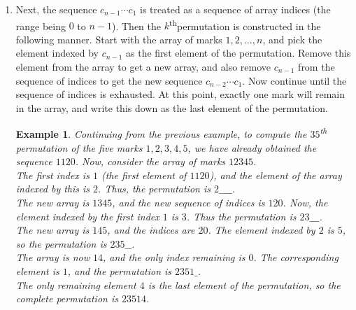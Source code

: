\documentclass[svgnames]{article}
\renewcommand{\th}{\textsuperscript{th}}
\newtheorem{Example}{Example}
\begin{document}
\begin{enumerate}
\item Next, the sequence $c_{n-1} \cdots c_1$ is treated as a sequence of array indices (the range being $0$ to $n - 1$). Then the $k$\th permutation is constructed in the following manner. Start with the array of marks $1, 2, \ldots, n$, and pick the element indexed by $c_{n-1}$ as the first element of the permutation. Remove this element from the array to get a new array, and also remove $c_{n-1}$ from the sequence of indices to get the new sequence $c_{n-2} \cdots c_1$. Now continue until the sequence of indices is exhausted. At this point, exactly one mark will remain in the array, and write this down as the last element of the permutation.
\begin{Example}
Continuing from the previous example, to compute the $35$\th \\ permutation of the five marks $1, 2, 3, 4, 5$, we have already obtained the sequence $1120$. Now, consider the array of marks $12345$.\\
The first index is $1$ (the first element of $1120$), and the element of the array indexed by this is $2$. Thus, the permutation is $2\_\_\_\_$.\\
The new array is $1345$, and the new sequence of indices is $120$. Now, the element indexed by the first index $1$ is $3$. Thus the permutation is $23\_\_\_$.\\
The new array is $145$, and the indices are $20$. The element indexed by $2$ is $5$, so the permutation is $235\_\_$.\\
The array is now $14$, and the only index remaining is $0$. The corresponding element is $1$, and the permutation is $2351\_$.\\
The only remaining element $4$ is the last element of the permutation, so the complete permutation is $\boxed{23514}$.
\end{Example}
\end{enumerate}
\end{document}
